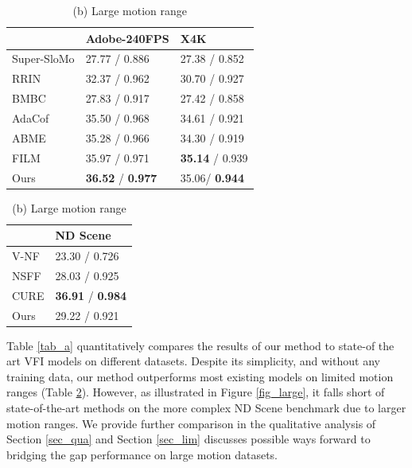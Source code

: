 \documentclass{article}
\begin{document}
\begin{table}[!hb]
    \caption{Quantitative comparison to state-of-the-art VFI on Standard benchmarks. Results are formatted as PSNR / SSMI.}
    \begin{minipage}[t]{.5\linewidth}
      \centering
      \caption*{(a) Limited motion range}
      \begin{tabular}[t]{l | l | l }
       &  Adobe-240FPS &  X4K  \\
      \hline
      Super-SloMo \citep{jiang2018super} &  27.77 / 0.886 & 27.38 / 0.852  \\
      RRIN \cite{li2020video}  & 32.37 / 0.962 & 30.70 / 0.927  \\
      BMBC \citep{park2020bmbc}  & 27.83 / 0.917 & 27.42 / 0.858   \\
      AdaCof \cite{lee2020adacof} & 35.50 / 0.968 & 34.61 / 0.921 \\
      ABME   \cite{park2021asymmetric} & 35.28 / 0.966 & 34.30 / 0.919 \\
      FILM   \cite{reda2022film} &	35.97 / 0.971 & \textbf{35.14} / 0.939 \\
      Ours	& \textbf{36.52} / \textbf{0.977} & 35.06/ \textbf{0.944} \\
      \end{tabular}
    \label{tab_a}
    \end{minipage}%
    \begin{minipage}[t]{.5\linewidth}
      \centering
      \caption*{(b) Large motion range}
        \begin{tabular}[t]{l | l }
        	    &   ND Scene  \\
        \hline
        V-NF \cite{mildenhall2020nerf}   &  23.30 / 0.726 \\
        NSFF \cite{li2021neural}   & 28.03 / 0.925 \\
        CURE \cite{shangguan2022learning}   & \textbf{36.91} / \textbf{0.984} \\
        Ours	     & 29.22 / 0.921
        \end{tabular}
	\label{tab_b}
    \end{minipage}

\end{table}

Table \ref{tab_a} quantitatively compares the results of our method to state-of the art VFI models on different datasets.
Despite its simplicity, and without any training data, our method outperforms most existing models on limited motion ranges (Table \ref{tab_b}).
However, as illustrated in Figure \ref{fig_large}, it falls short of state-of-the-art methods on the more complex ND Scene benchmark due to larger motion ranges.
We provide further comparison in the qualitative analysis of Section \ref{sec_qua} and Section \ref{sec_lim}
discusses possible ways forward to bridging the gap performance on large motion datasets.
\end{document}
